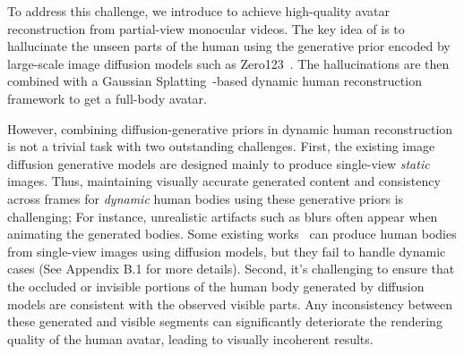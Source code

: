 

To address this challenge, we introduce \name to achieve high-quality avatar reconstruction from partial-view monocular videos. 
The key idea of \name is to hallucinate the unseen parts of the human using the generative prior encoded by large-scale image diffusion models such as Zero123~\cite{liu2023zero1to3}. The hallucinations are then combined with a Gaussian Splatting~\cite{kerbl3Dgaussians}-based dynamic human reconstruction framework to get a full-body avatar.  %

However, combining diffusion-generative priors in dynamic human reconstruction is not a trivial task with two outstanding challenges. First, the existing image diffusion generative models are designed mainly to produce single-view \textit{ static} images. Thus, maintaining visually accurate generated content and consistency across frames for \textit{dynamic} human bodies using these generative priors is challenging; For instance, unrealistic artifacts such as blurs often appear when animating the generated bodies. Some existing works~\cite{ho2024sith,huang2023tech,albahar2023single} can produce human bodies from single-view images using diffusion models, but they fail to handle dynamic cases (See Appendix B.1 for more details). Second, it's challenging to ensure that the occluded or invisible portions of the human body generated by diffusion models are consistent with the observed visible parts. Any inconsistency between these generated and visible segments can significantly deteriorate the rendering quality of the human avatar, leading to visually incoherent results. 

